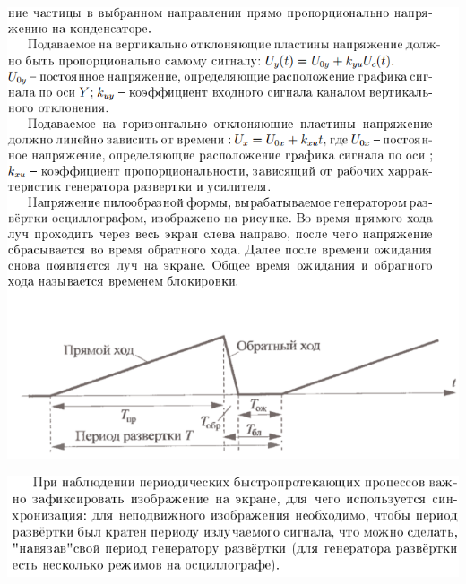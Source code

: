 \documentclass[a4paper,12pt]{article} %
\begin{document}
\begin{center}
\includegraphics{6}
\end{center}
\begin{center}
\includegraphics{7}
\end{center}
\end{document}
